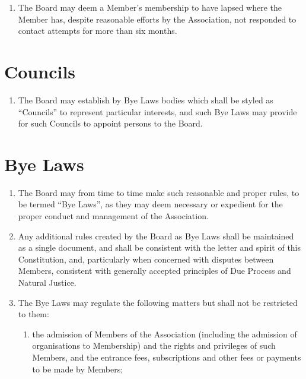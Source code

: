\documentclass[10pt]{mk-articles-of-association}
\newcommand{\mysection}[1]{
  \end{enumerate}
  \section*{#1}
  \begin{enumerate}[resume]
}
\newcommand{\EC}[0]{Board}
\newcommand{\Exec}[0]{\EC{} }
\begin{document}
\begin{enumerate}
\begin{enumerate}

\item the Member has been given at least twenty-one clear days' notice in
  writing of the meeting of the \Exec at which the resolution will
  be proposed and the reasons why it is to be proposed,

\item the Member or, at the option of the Member, the Member's
  representative (who need not be a Member of the Association) has been
  allowed to make representations to the meeting.

\end{enumerate}

\item The \Exec may deem a Member's membership to have lapsed where
  the Member has, despite reasonable efforts by the Association, not
  responded to contact attempts for more than six months.
  \label{lapse}


\mysection{Councils}

\item The \EC{} may establish by Bye Laws bodies which
  shall be styled as ``Councils'' to represent particular interests, and
  such Bye Laws may provide for such Councils to appoint persons to
  the \EC{}.\label{councils}



\mysection{Bye Laws}

\item The \Exec may from time to time make such reasonable and proper
  rules, to be termed ``Bye Laws'', as they may deem necessary or
  expedient for the proper conduct and management of the Association.

\item Any additional rules created by the \Exec as Bye Laws
  shall be maintained as a single document, and shall be
  consistent with the letter and spirit of this Constitution, and,
  particularly when concerned with disputes between Members,
  consistent with generally accepted principles of Due Process and
  Natural Justice.

\item The Bye Laws may regulate the following matters but shall not be
  restricted to them:

\begin{enumerate}

\item the admission of Members of the Association (including the admission
  of organisations to Membership) and the rights and privileges of
  such Members, and the entrance fees, subscriptions and other fees or
  payments to be made by Members;


\end{enumerate}
\end{enumerate}
\end{document}
